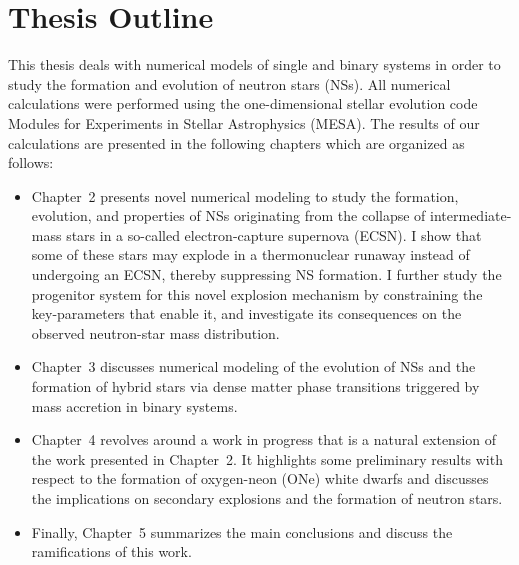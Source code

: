 \documentclass[main.tex]{subfiles}
\begin{document}

    \section{Thesis Outline}
    This thesis deals with numerical models of single and binary systems in order to study the formation and evolution of neutron stars (NSs). All numerical calculations were performed using the one-dimensional stellar evolution code Modules for Experiments in Stellar Astrophysics (MESA). The results of our calculations are presented in the following chapters which are organized as follows:
    \begin{itemize}
        \item Chapter~2 presents novel numerical modeling to study the formation, evolution, and properties of NSs originating from the collapse of intermediate-mass stars in a so-called electron-capture supernova (ECSN). I show that some of these stars may explode in a thermonuclear runaway instead of undergoing an ECSN, thereby suppressing NS formation. I further study the progenitor system for this novel explosion mechanism by constraining the key-parameters that enable it, and investigate its consequences on the observed neutron-star mass distribution.

        \item Chapter~3 discusses numerical modeling of the evolution of NSs and the formation of hybrid stars via dense matter phase transitions triggered by mass accretion in binary systems.

        \item Chapter~4 revolves around a work in progress that is a natural extension of the work presented in Chapter~2. It highlights some preliminary results with respect to the formation of oxygen-neon (ONe) white dwarfs and discusses the implications on secondary explosions and the formation of neutron stars.

        \item Finally, Chapter~5 summarizes the main conclusions and discuss the ramifications of this work.
    \end{itemize}
    
\end{document}

